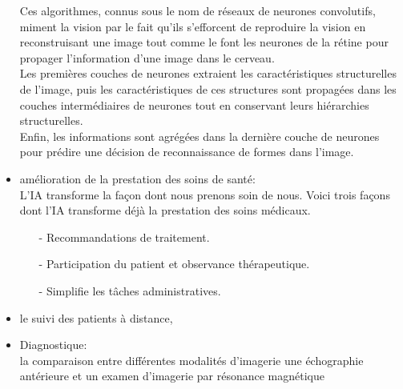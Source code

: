 \begin{itemize}
                Ces algorithmes, connus sous le nom de réseaux
                de neurones convolutifs, miment la vision par le fait
                qu'ils s'efforcent de reproduire la vision en
                reconstruisant une image tout comme le font les neurones
                de la rétine pour propager l'information d'une image dans
                le cerveau.\\

                Les premières couches de neurones extraient
                les caractéristiques structurelles de l'image, puis les
                caractéristiques de ces structures sont propagées dans les
                couches intermédiaires de neurones tout en conservant
                leurs hiérarchies structurelles.\\

                Enfin, les informations sont agrégées dans la dernière couche de neurones pour
                prédire une décision de reconnaissance de formes dans
                l'image. \\[0.25cm]

        \item amélioration de la prestation des soins de santé: \\[0.1cm]

            L'IA transforme la façon dont nous prenons soin de
            nous. Voici trois façons dont l'IA transforme déjà la
            prestation des soins médicaux.

            \medskip
            \begin{itemize}
                \item[-] Recommandations de traitement.
                \item[-] Participation du patient et observance thérapeutique.
                \item[-] Simplifie les tâches administratives.
                    \\[0.25cm]
            \end{itemize}

        \item le suivi des patients à distance,
            \\[0.25cm]

        \item Diagnostique:\\[0.1cm]

                la comparaison entre différentes modalités d'imagerie une
                échographie antérieure et un examen d'imagerie par résonance
                magnétique \\[0.25cm]


\end{itemize}
